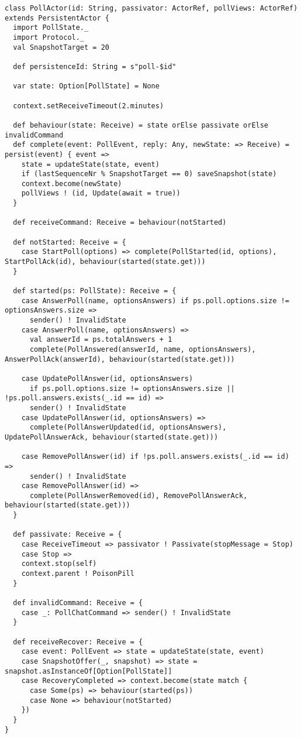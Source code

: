 \begin{lstlisting}[style=listing, caption={Персистентен актьор за анкета}]
class PollActor(id: String, passivator: ActorRef, pollViews: ActorRef) extends PersistentActor {
  import PollState._
  import Protocol._
  val SnapshotTarget = 20
  
  def persistenceId: String = s"poll-$id"
  
  var state: Option[PollState] = None
  
  context.setReceiveTimeout(2.minutes)
  
  def behaviour(state: Receive) = state orElse passivate orElse invalidCommand
  def complete(event: PollEvent, reply: Any, newState: => Receive) = persist(event) { event =>
    state = updateState(state, event)
    if (lastSequenceNr % SnapshotTarget == 0) saveSnapshot(state)
    context.become(newState)
    pollViews ! (id, Update(await = true))
  }
  
  def receiveCommand: Receive = behaviour(notStarted)
  
  def notStarted: Receive = {
    case StartPoll(options) => complete(PollStarted(id, options), StartPollAck(id), behaviour(started(state.get)))
  }
  
  def started(ps: PollState): Receive = {
    case AnswerPoll(name, optionsAnswers) if ps.poll.options.size != optionsAnswers.size =>
      sender() ! InvalidState
    case AnswerPoll(name, optionsAnswers) =>
      val answerId = ps.totalAnswers + 1
      complete(PollAnswered(answerId, name, optionsAnswers), AnswerPollAck(answerId), behaviour(started(state.get)))
    
    case UpdatePollAnswer(id, optionsAnswers)
      if ps.poll.options.size != optionsAnswers.size || !ps.poll.answers.exists(_.id == id) =>
      sender() ! InvalidState
    case UpdatePollAnswer(id, optionsAnswers) =>
      complete(PollAnswerUpdated(id, optionsAnswers), UpdatePollAnswerAck, behaviour(started(state.get)))
    
    case RemovePollAnswer(id) if !ps.poll.answers.exists(_.id == id) =>
      sender() ! InvalidState
    case RemovePollAnswer(id) =>
      complete(PollAnswerRemoved(id), RemovePollAnswerAck, behaviour(started(state.get)))
  }
  
  def passivate: Receive = {
    case ReceiveTimeout => passivator ! Passivate(stopMessage = Stop)
    case Stop =>
    context.stop(self)
    context.parent ! PoisonPill
  }
  
  def invalidCommand: Receive = {
    case _: PollChatCommand => sender() ! InvalidState
  }
  
  def receiveRecover: Receive = {
    case event: PollEvent => state = updateState(state, event)
    case SnapshotOffer(_, snapshot) => state = snapshot.asInstanceOf[Option[PollState]]
    case RecoveryCompleted => context.become(state match {
      case Some(ps) => behaviour(started(ps))
      case None => behaviour(notStarted)
    })
  }
}
\end{lstlisting}

